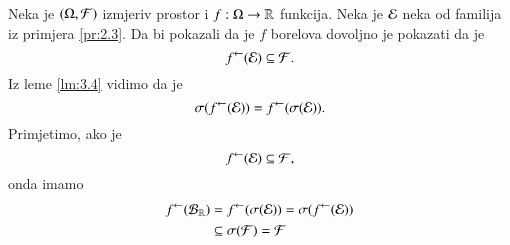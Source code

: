 \begin{nap} \label{nap:3.20-1}
    Neka je $(\Omega, \mathcal{F})$ izmjeriv prostor i $f: \Omega \to \mathbb{R}$ funkcija.
    Neka je $\mathcal{E}$ neka od familija iz primjera \ref{pr:2.3}.
    Da bi pokazali da je $f$ borelova dovoljno je pokazati da je
    \begin{equation}
        {f}^{\leftarrow} (\mathcal{E}) \subseteq \mathcal{F}.
    \end{equation}
    Iz leme \ref{lm:3.4} vidimo da je
    \begin{equation*}
        \sigma({{f}^{\leftarrow}(\mathcal{E})}) = {f}^{\leftarrow} (\sigma({\mathcal{E}})).
    \end{equation*}
    Primjetimo, ako je
    \begin{equation*}
        {f}^{\leftarrow} (\mathcal{E}) \subseteq \mathcal{F},
    \end{equation*}
    onda imamo
    \begin{equation}
        \begin{aligned}
            {f}^{\leftarrow} (\mathcal{B}_{\mathbb{R}})  &= {f}^{\leftarrow} (\sigma({\mathcal{E}})) = \sigma({{f}^{\leftarrow} (\mathcal{E})})\\
            &\subseteq \sigma({\mathcal{F}}) = \mathcal{F}
        \end{aligned}
    \end{equation}
\end{nap}